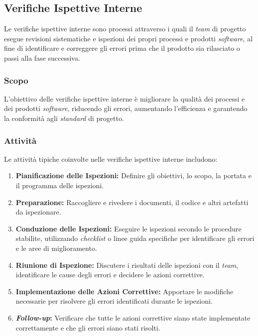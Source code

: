 \subsection{Verifiche Ispettive Interne}

Le verifiche ispettive interne sono processi attraverso i quali il \textit{team} di
progetto esegue revisioni sistematiche e ispezioni dei propri processi e
prodotti \textit{software}, al fine di identificare e correggere gli errori
prima che il prodotto sia rilasciato o passi alla fase successiva.

\subsubsection{Scopo}
L'obiettivo delle verifiche ispettive interne è migliorare la qualità dei
processi e dei prodotti \textit{software}, riducendo gli errori, aumentando
l'efficienza e garantendo la conformità agli \textit{standard} di progetto.

\subsubsection{Attività}
Le attività tipiche coinvolte nelle verifiche ispettive interne includono:

\begin{enumerate}
	\item \textbf{Pianificazione delle Ispezioni:} Definire gli obiettivi, lo
	      scopo, la portata e il programma delle ispezioni.
	\item \textbf{Preparazione:} Raccogliere e rivedere i documenti, il codice e
	      altri artefatti da ispezionare.
	\item \textbf{Conduzione delle Ispezioni:} Eseguire le ispezioni secondo le
	      procedure stabilite, utilizzando \textit{checklist} o linee guida
	      specifiche per identificare gli errori e le aree di miglioramento.
	\item \textbf{Riunione di Ispezione:} Discutere i risultati delle ispezioni
	      con il \textit{team}, identificare le cause degli errori e decidere le azioni
	      correttive.
	\item \textbf{Implementazione delle Azioni Correttive:} Apportare le
	      modifiche necessarie per risolvere gli errori identificati durante le
	      ispezioni.
	\item \textbf{\textit{Follow-up}:} Verificare che tutte le azioni
	      correttive siano state implementate correttamente e che gli errori
	      siano stati risolti.
\end{enumerate}


